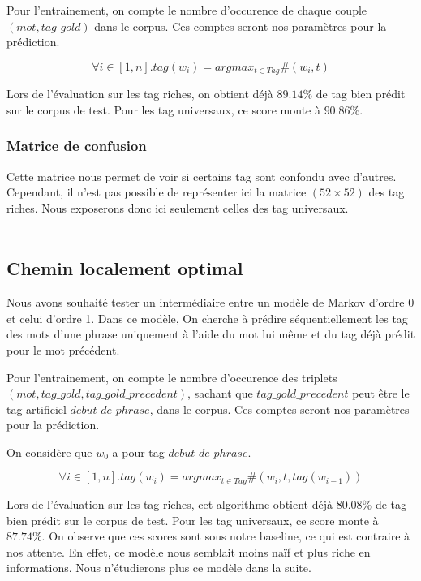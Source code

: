 \documentclass{article}
\begin{document}
Pour l'entrainement, on compte le nombre d'occurence de chaque couple $(mot,tag\_gold)$ dans le corpus. Ces comptes seront nos paramètres pour la prédiction.

$$\forall i \in [1,n] . tag(w_i) = argmax_{t \in Tag} \#(w_i,t)$$

Lors de l'évaluation sur les tag riches, on obtient déjà $89.14\%$ de tag bien prédit sur le corpus de test. Pour les tag universaux, ce score monte à $90.86\%$. 

\subsubsection{Matrice de confusion}

Cette matrice nous permet de voir si certains tag sont confondu avec d'autres. Cependant, il n'est pas possible de représenter ici la matrice $(52 \times 52)$ des tag riches. Nous exposerons donc ici seulement celles des tag universaux.

$$
\begin{array}{l|c|c|c|c|c|c|c|c|c|c|c|c}

\end{array}
$$

\subsection{Chemin localement optimal}

Nous avons souhaité tester un intermédiaire entre un modèle de Markov d'ordre 0 et celui d'ordre 1. Dans ce modèle, On cherche à prédire séquentiellement les tag des mots d'une phrase uniquement à l'aide du mot lui même et du tag déjà prédit pour le mot précédent. 

Pour l'entrainement, on compte le nombre d'occurence des triplets $(mot,tag\_gold,tag\_gold\_precedent)$, sachant que $tag\_gold\_precedent$ peut être le tag artificiel $debut\_de\_phrase$, dans le corpus. Ces comptes seront nos paramètres pour la prédiction.

On considère que $w_0$ a pour tag $debut\_de\_phrase$.

$$\forall i \in [1,n] . tag (w_i) = argmax_{t \in Tag} \#(w_i,t,tag(w_{i-1}))$$

Lors de l'évaluation sur les tag riches, cet algorithme obtient déjà $80.08\%$ de tag bien prédit sur le corpus de test. Pour les tag universaux, ce score monte à $87.74\%$. On observe que ces scores sont sous notre baseline, ce qui est contraire à nos attente. En effet, ce modèle nous semblait moins naïf et plus riche en informations. Nous n'étudierons plus ce modèle dans la suite.
\end{document}
